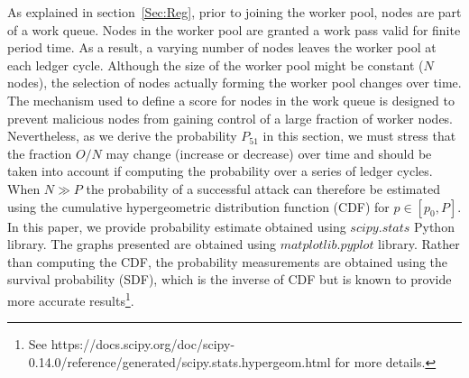As explained in section~\ref{Sec:Reg}, prior to joining the worker pool, nodes are part of a work queue. Nodes in the worker pool are granted a work pass valid for finite period time. As a result, a varying number of nodes leaves the worker pool at each ledger cycle. Although the size of the worker pool might be constant ($N$ nodes), the selection of nodes actually forming the worker pool changes over time. The mechanism used to define a score for nodes in the work queue is designed to prevent malicious nodes from gaining control of a large fraction of worker nodes. Nevertheless, as we derive the probability $P_{51}$ in this section, we must stress that the fraction $O/N$ may change (increase or decrease) over time and should be taken into account if computing the probability over a series of ledger cycles.\\

When $N \gg P$ the probability of a successful attack can therefore be estimated using the cumulative hypergeometric distribution function (CDF) for $p \in [p_0,P]$. In this paper, we provide probability estimate obtained using $scipy.stats$ Python library. The graphs presented are obtained using $matplotlib.pyplot$ library. Rather than computing the CDF, the probability measurements are obtained using the survival probability (SDF), which is the inverse of CDF but is known to provide more accurate results\footnote{See https://docs.scipy.org/doc/scipy-0.14.0/reference/generated/scipy.stats.hypergeom.html for more details.}. \\

